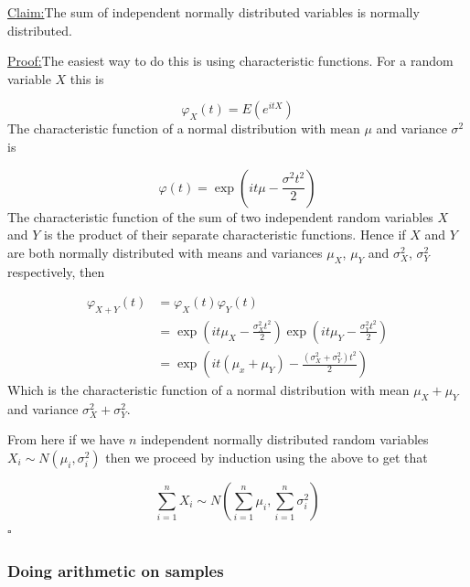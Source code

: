 \documentclass[a4paper]{article}
\renewcommand{\qed}{\hfill\ensuremath{\square}}
\newenvironment{claim}[1]{\par\noindent\underline{Claim:}\space#1}{}
\newenvironment{claimproof}[1]{\par\noindent\underline{Proof:}\space#1}{\qed}
\begin{document}
\begin{mdframed}
	\begin{claim}
	  The sum of independent normally distributed variables is normally distributed.
	\end{claim}
	\begin{claimproof}
	  The easiest way to do this is using characteristic functions. For a random variable \(X\) this is

	  \[\varphi_X(t) = E(e^{itX})\]
	  The characteristic function of a normal distribution with mean \(\mu\) and variance \(\sigma^2\) is

	  \[\varphi(t) = \exp(i t \mu - \frac{\sigma^2 t^2}{2})\]
	  The characteristic function of the sum of two independent random variables \(X\) and \(Y\) is the product of their separate characteristic functions. Hence if \(X\) and \(Y\) are both normally distributed with means and variances \(\mu_X\), \(\mu_Y\) and \(\sigma_X^2\), \(\sigma_Y^2\) respectively, then

  	\begin{align*}
  		\varphi_{X+Y}(t)
  		& = \varphi_X(t) \varphi_Y(t) \\
  		& = \exp\left(i t \mu_X - \frac{\sigma_X^2 t^2}{2}\right) \exp\left(i t \mu_Y - \frac{\sigma_Y^2 t^2}{2}\right) \\
  		& = \exp\left(i t (\mu_x + \mu_Y) - \frac{(\sigma_X^2 + \sigma_Y^2) t^2}{2}\right)
  	\end{align*}
	  Which is the characteristic function of a normal distribution with mean \(\mu_X + \mu_Y\) and variance \(\sigma_X^2 + \sigma_Y^2\).

	  From here if we have \(n\) independent normally distributed random variables \(X_i \sim N(\mu_i, \sigma_i^2)\) then we proceed by induction using the above to get that

	  \[\sum_{i=1}^n X_i \sim N(\sum_{i=1}^n \mu_i, \sum_{i=1}^n \sigma_i^2)\]
	\end{claimproof}
\end{mdframed}




\subsubsection{Doing arithmetic on samples}
\end{document}
